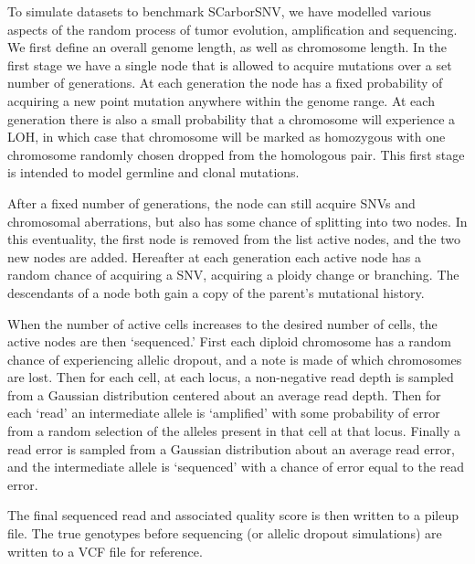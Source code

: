 \documentclass[../../main.tex]{subfiles}
\begin{document}
To simulate datasets to benchmark SCarborSNV, we have modelled various aspects of the random process of tumor evolution, amplification and sequencing.
We first define an overall genome length, as well as chromosome length.
In the first stage we have a single node that is allowed to acquire mutations over a set number of generations.
At each generation the node has a fixed probability of acquiring a new point mutation anywhere within the genome range.
At each generation there is also a small probability that a chromosome will experience a LOH, in which case that chromosome will be marked as homozygous with one chromosome randomly chosen dropped from the homologous pair.
This first stage is intended to model germline and clonal mutations.

After a fixed number of generations, the node can still acquire SNVs and chromosomal aberrations, but also has some chance of splitting into two nodes.
In this eventuality, the first node is removed from the list active nodes, and the two new nodes are added.
Hereafter at each generation each active node has a random chance of acquiring  a SNV, acquiring a ploidy change or branching.
The descendants of a node both gain a copy of the parent's mutational history.

When the number of active cells increases to the desired number of cells, the active nodes are then `sequenced.'
First each diploid chromosome has a random chance of experiencing allelic dropout, and a note is made of which chromosomes are lost.
Then for each cell, at each locus, a non-negative read depth is sampled from a Gaussian distribution centered about an average read depth.
Then for each `read' an intermediate allele is `amplified' with some probability of error from a random selection of the alleles present in that cell at that locus.
Finally a read error is sampled from a Gaussian distribution about an average read error, and the intermediate allele is `sequenced' with a chance of error equal to the read error.

The final sequenced read and associated quality score is then written to a pileup file.
The true genotypes before sequencing (or allelic dropout simulations) are written to a VCF file for reference.
\end{document}
